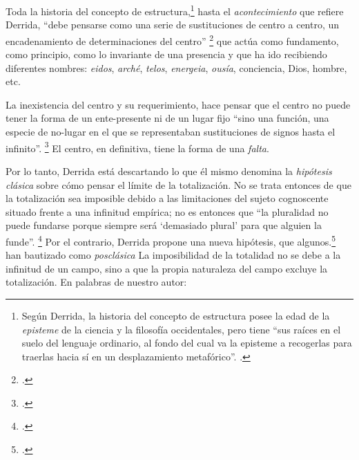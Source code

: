 Toda la historia del concepto de estructura,\footnote{Según Derrida, la historia del concepto de estructura posee la edad de la \emph{episteme} de la ciencia y la filosofía occidentales, pero tiene \enquote{sus raíces en el suelo del lenguaje ordinario, al fondo del cual va la episteme a recogerlas para traerlas hacia sí en un desplazamiento metafórico}. \cite[][388]{@6997-DERRIDA1989}.} hasta el \emph{acontecimiento} que refiere Derrida, \enquote{debe pensarse como una serie de sustituciones de centro a centro, un encadenamiento de determinaciones del centro} \footcite[][385]{@6997-DERRIDA1989} que actúa como fundamento, como principio, como lo invariante de una presencia y que ha ido recibiendo diferentes nombres: \emph{eidos}, \emph{arché}, \emph{telos}, \emph{energeia}, \emph{ousía}, conciencia, Dios, hombre, etc.

La inexistencia del centro y su requerimiento, hace pensar que el centro no puede tener la forma de un ente-presente ni de un lugar fijo \enquote{sino una función, una especie de no-lugar en el que se representaban sustituciones de signos hasta el infinito}. \footcite[][385]{@6997-DERRIDA1989} El centro, en definitiva, tiene la forma de una \emph{falta}.

Por lo tanto, Derrida está descartando lo que él mismo denomina la \emph{hipótesis clásica} sobre cómo pensar el límite de la totalización. No se trata entonces de que la totalización sea imposible debido a las limitaciones del sujeto cognoscente situado frente a una infinitud empírica; no es entonces que \enquote{la pluralidad no puede fundarse porque siempre será \enquote{demasiado plural} para que alguien la funde}. \footcite[][32]{@6998-MARCHART2009} Por el contrario, Derrida propone una nueva hipótesis, que algunos.\footcite[Véase][32]{@6998-MARCHART2009} han bautizado como \emph{posclásica} La imposibilidad de la totalidad no se debe a la infinitud de un campo, sino a que la propia naturaleza del campo excluye la totalización. En palabras de nuestro autor:


